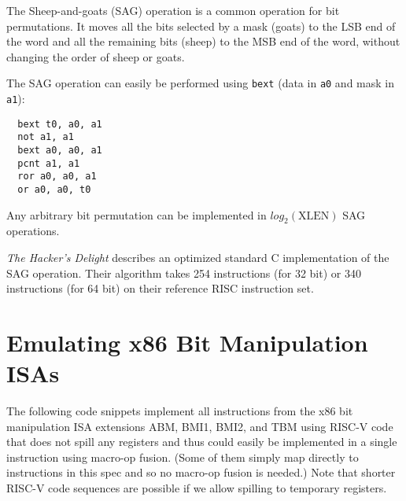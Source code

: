 The Sheep-and-goats (SAG) operation is a common operation for bit permutations.
It moves all the bits selected by a mask (goats) to the LSB end of the word
and all the remaining bits (sheep) to the MSB end of the word, without changing
the order of sheep or goats.

The SAG operation can easily be performed using {\tt bext} (data in {\tt a0} and
mask in {\tt a1}):

\begin{verbatim}
  bext t0, a0, a1
  not a1, a1
  bext a0, a0, a1
  pcnt a1, a1
  ror a0, a0, a1
  or a0, a0, t0
\end{verbatim}

Any arbitrary bit permutation can be implemented in $log_2(\textrm{XLEN})$ SAG
operations.

{\it The Hacker's Delight} describes an optimized standard C implementation of
the SAG operation. Their algorithm takes 254 instructions (for 32 bit) or 340
instructions (for 64 bit) on their reference RISC instruction
set.~\cite[p.~152f,~162f]{Seander05}


\section{Emulating x86 Bit Manipulation ISAs}

The following code snippets implement all instructions from the x86 bit manipulation
ISA extensions ABM, BMI1, BMI2, and TBM using RISC-V code that does not spill any
registers and thus could easily be implemented in a single instruction using macro-op
fusion. (Some of them simply map directly to instructions in this spec and so no
macro-op fusion is needed.) Note that shorter RISC-V code sequences are possible if
we allow spilling to temporary registers.

